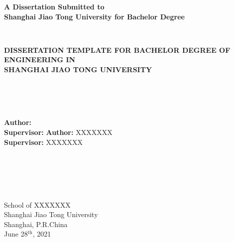 \thispagestyle{empty}
\begin{center}
\textbf{
A Dissertation Submitted to \\
Shanghai Jiao Tong University for Bachelor Degree}
\end{center}
~\\
\begin{center}
\textbf{
DISSERTATION TEMPLATE FOR BACHELOR DEGREE OF ENGINEERING IN \\
SHANGHAI JIAO TONG UNIVERSITY}
\end{center}
~\\
~\\
~\\
\begin{center}
\ifreview
\textbf{Author:}  \\   %
\textbf{Supervisor:}    %
\else
\textbf{Author:}  XXXXXXX\\
\textbf{Supervisor:}   XXXXXXX
\fi
\end{center}
~\\
~\\
~\\
~\\
\begin{center}
School of XXXXXXX \\
Shanghai Jiao Tong University \\
Shanghai, P.R.China \\
June 28$^{\mathrm{th}}$, 2021  
\end{center}

\clearsection